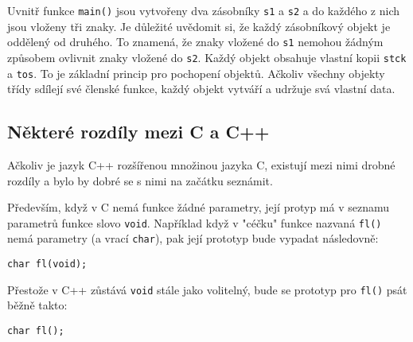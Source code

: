       Uvnitř funkce \lstinline[style=luaCPPText]!main()! jsou vytvořeny dva zásobníky
      \lstinline[style=luaCPPText]!s1! a \lstinline[style=luaCPPText]!s2! a do každého z nich jsou
      vloženy tři znaky. Je důležité uvědomit si, že každý zásobníkový objekt je oddělený od
      druhého. To znamená, že znaky vložené do \lstinline[style=luaCPPText]!s1! nemohou žádným
      způsobem ovlivnit znaky vložené do \lstinline[style=luaCPPText]!s2!. Každý objekt obsahuje
      vlastní kopii \lstinline[style=luaCPPText]!stck! a \lstinline[style=luaCPPText]!tos!. To je
      základní princip pro pochopení objektů. Ačkoliv všechny objekty třídy sdílejí své členské
      funkce, každý objekt vytváří a udržuje svá vlastní data.
  
    \subsection{Některé rozdíly mezi C a C++}
      Ačkoliv je jazyk C++ rozšířenou množinou jazyka C, existují mezi nimi drobné rozdíly a bylo by
      dobré se s nimi na začátku seznámit. 
      
      Především, když v C nemá funkce žádné parametry, její protyp má v seznamu parametrů funkce
      slovo \lstinline[style=luaCPPText]!void!. Například když v "céčku" funkce nazvaná
      \lstinline[style=luaCPPText]!fl()! nemá parametry (a vrací
      \lstinline[style=luaCPPText]!char!), pak její prototyp bude vypadat následovně:
      \begin{lstlisting}[style=luaCPPStyle]
        char fl(void);
      \end{lstlisting}
      Přestože v C++ zůstává \lstinline[style=luaCPPText]!void! stále jako volitelný, bude se
      prototyp pro \lstinline[style=luaCPPText]!fl()! psát běžně takto:
      \begin{lstlisting}[style=luaCPPStyle]
        char fl();
      \end{lstlisting}
  
